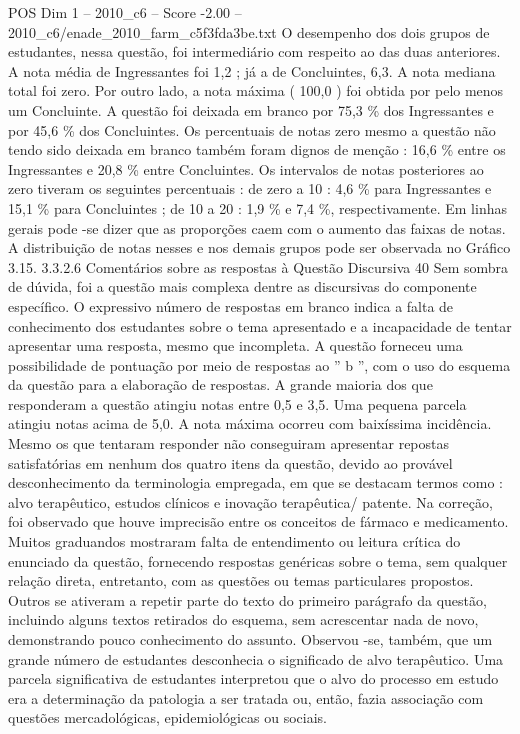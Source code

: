 \begin{textsample}{POS Dim 1 – 2010\_c6 – Score -2.00 – 2010\_c6/enade\_2010\_farm\_c5f3fda3be.txt}
O desempenho dos dois grupos de estudantes, nessa questão, foi intermediário com respeito ao das duas anteriores.
A nota média de Ingressantes foi 1,2 ; já a de Concluintes, 6,3.
A nota mediana total foi zero.
Por outro lado, a nota máxima ( 100,0 ) foi obtida por pelo menos um Concluinte.
A questão foi deixada em branco por 75,3 \% dos Ingressantes e por 45,6 \% dos Concluintes.
Os percentuais de notas zero mesmo a questão não tendo sido deixada em branco também foram dignos de menção : 16,6 \% entre os Ingressantes e 20,8 \% entre Concluintes.
Os intervalos de notas posteriores ao zero tiveram os seguintes percentuais : de zero a 10 : 4,6 \% para Ingressantes e 15,1 \% para Concluintes ; de 10 a 20 : 1,9 \% e 7,4 \%, respectivamente.
Em linhas gerais pode -se dizer que as proporções caem com o aumento das faixas de notas.
A distribuição de notas nesses e nos demais grupos pode ser observada no Gráfico 3.15. 3.3.2.6 Comentários sobre as respostas à Questão Discursiva 40 Sem sombra de dúvida, foi a questão mais complexa dentre as discursivas do componente específico.
O expressivo número de respostas em branco indica a falta de conhecimento dos estudantes sobre o tema apresentado e a incapacidade de tentar apresentar uma resposta, mesmo que incompleta.
A questão forneceu uma possibilidade de pontuação por meio de respostas ao ” b ”, com o uso do esquema da questão para a elaboração de respostas.
A grande maioria dos que responderam a questão atingiu notas entre 0,5 e 3,5.
Uma pequena parcela atingiu notas acima de 5,0.
A nota máxima ocorreu com baixíssima incidência.
Mesmo os que tentaram responder não conseguiram apresentar repostas satisfatórias em nenhum dos quatro itens da questão, devido ao provável desconhecimento da terminologia empregada, em que se destacam termos como : alvo terapêutico, estudos clínicos e inovação terapêutica/ patente.
Na correção, foi observado que houve imprecisão entre os conceitos de fármaco e medicamento.
Muitos graduandos mostraram falta de entendimento ou leitura crítica do enunciado da questão, fornecendo respostas genéricas sobre o tema, sem qualquer relação direta, entretanto, com as questões ou temas particulares propostos.
Outros se ativeram a repetir parte do texto do primeiro parágrafo da questão, incluindo alguns textos retirados do esquema, sem acrescentar nada de novo, demonstrando pouco conhecimento do assunto.
Observou -se, também, que um grande número de estudantes desconhecia o significado de alvo terapêutico.
Uma parcela significativa de estudantes interpretou que o alvo do processo em estudo era a determinação da patologia a ser tratada ou, então, fazia associação com questões mercadológicas, epidemiológicas ou sociais.

\end{textsample}
